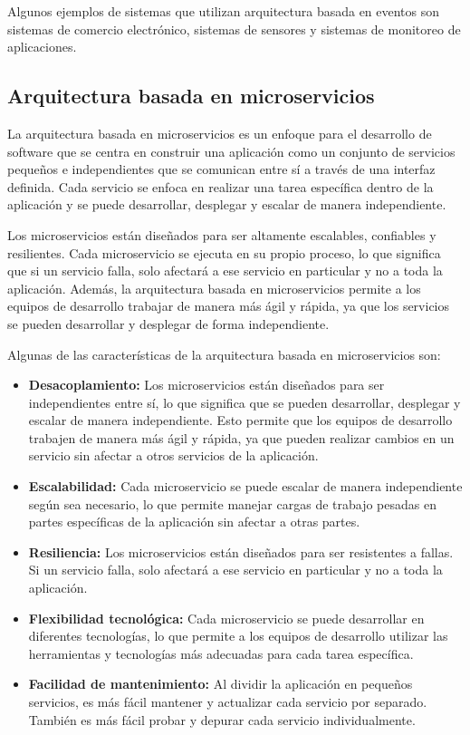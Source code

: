 \documentclass[executivepaper]{article}
\begin{document}
Algunos ejemplos de sistemas que utilizan arquitectura basada en eventos son sistemas de comercio electrónico, sistemas de sensores y sistemas de monitoreo de aplicaciones.

\subsection{Arquitectura basada en microservicios}

La arquitectura basada en microservicios es un enfoque para el desarrollo de software que se centra en construir una aplicación como un conjunto de servicios pequeños e independientes que se comunican entre sí a través de una interfaz definida. Cada servicio se enfoca en realizar una tarea específica dentro de la aplicación y se puede desarrollar, desplegar y escalar de manera independiente.

Los microservicios están diseñados para ser altamente escalables, confiables y resilientes. Cada microservicio se ejecuta en su propio proceso, lo que significa que si un servicio falla, solo afectará a ese servicio en particular y no a toda la aplicación. Además, la arquitectura basada en microservicios permite a los equipos de desarrollo trabajar de manera más ágil y rápida, ya que los servicios se pueden desarrollar y desplegar de forma independiente.

Algunas de las características de la arquitectura basada en microservicios son:

\begin{itemize}
\item \textbf{Desacoplamiento:} Los microservicios están diseñados para ser independientes entre sí, lo que significa que se pueden desarrollar, desplegar y escalar de manera independiente. Esto permite que los equipos de desarrollo trabajen de manera más ágil y rápida, ya que pueden realizar cambios en un servicio sin afectar a otros servicios de la aplicación.
\item \textbf{Escalabilidad:} Cada microservicio se puede escalar de manera independiente según sea necesario, lo que permite manejar cargas de trabajo pesadas en partes específicas de la aplicación sin afectar a otras partes.
\item \textbf{Resiliencia:} Los microservicios están diseñados para ser resistentes a fallas. Si un servicio falla, solo afectará a ese servicio en particular y no a toda la aplicación.
\item \textbf{Flexibilidad tecnológica:} Cada microservicio se puede desarrollar en diferentes tecnologías, lo que permite a los equipos de desarrollo utilizar las herramientas y tecnologías más adecuadas para cada tarea específica.
\item \textbf{Facilidad de mantenimiento:} Al dividir la aplicación en pequeños servicios, es más fácil mantener y actualizar cada servicio por separado. También es más fácil probar y depurar cada servicio individualmente.
\end{itemize}
\end{document}
